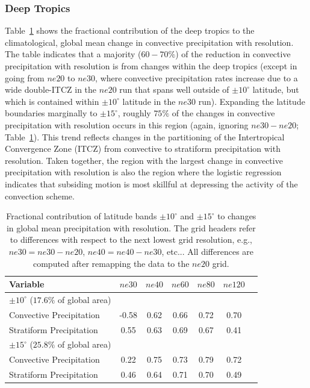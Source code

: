 \documentclass[times]{qjrms4}
\begin{document}
\subsubsection{Deep Tropics}

Table~\ref{tbl:table2} shows the fractional contribution of the deep tropics to the climatological, global mean change in convective precipitation with resolution. The table indicates that a majority ($60-70 \%$) of the reduction in convective precipitation with resolution is from changes within the deep tropics (except in going from $ne20$ to $ne30$, where convective precipitation rates increase due to a wide double-ITCZ in the $ne20$ run that spans well outside of $\pm 10^{\circ}$ latitude, but which is contained within $\pm 10^{\circ}$ latitude in the $ne30$ run). Expanding the latitude boundaries marginally to $\pm 15^{\circ}$, roughly $75\%$ of the changes in convective precipitation with resolution occurs in this region (again, ignoring $ne30-ne20$; Table~\ref{tbl:table2}). This trend reflects changes in the partitioning of the Intertropical Convergence Zone (ITCZ) from convective to stratiform precipitation with resolution. Taken together, the region with the largest change in convective precipitation with resolution is also the region where the logistic regression indicates that subsiding motion is most skillful at depressing the activity of the convection scheme.

 \begin{table}
 \caption{Fractional contribution of latitude bands $\pm 10^{\circ}$ and $\pm 15^{\circ}$ to changes in global mean precipitation with resolution. The grid headers refer to differences with respect to the next lowest grid resolution, e.g., $ne30 = ne30-ne20$, $ne40=ne40-ne30$, etc... All differences are computed after remapping the data to the $ne20$ grid.}
 \centering
 \scriptsize
 \begin{tabular}{lcccccc}
   \hline
   Variable & $ne30$ & $ne40$ & $ne60$ & $ne80$ & $ne120$ \\ 
   \hline
   $\pm 10^{\circ}$ ($17.6\%$ of global area) \\
   Convective Precipitation & -0.58 & 0.62 & 0.66 & 0.72 & 0.70 \\
   Stratiform Precipitation & 0.55 & 0.63 & 0.69 & 0.67 & 0.41 \\ 
   \hline
   $\pm 15^{\circ}$ ($25.8\%$ of global area) \\
   Convective Precipitation & 0.22 & 0.75 & 0.73 & 0.79 & 0.72 \\
   Stratiform Precipitation & 0.46 & 0.64 & 0.71 & 0.70 & 0.49 \\      
 \hline
 \end{tabular}
 \label{tbl:table2}
 \end{table}
\end{document}
